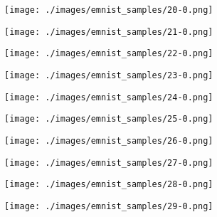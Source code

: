 \begin{figure}[H]
    \begin{subfigure}{.10\textwidth}
        \centering
        \texttt{[image: ./images/emnist\_samples/20-0.png]}
    \end{subfigure}%
    \begin{subfigure}{.10\textwidth}
        \centering
        \texttt{[image: ./images/emnist\_samples/21-0.png]}
    \end{subfigure}%
    \begin{subfigure}{.10\textwidth}
        \centering
        \texttt{[image: ./images/emnist\_samples/22-0.png]}
    \end{subfigure}%
    \begin{subfigure}{.10\textwidth}
        \centering
        \texttt{[image: ./images/emnist\_samples/23-0.png]}
    \end{subfigure}%
    \begin{subfigure}{.10\textwidth}
        \centering
        \texttt{[image: ./images/emnist\_samples/24-0.png]}
    \end{subfigure}%
    \begin{subfigure}{.10\textwidth}
        \centering
        \texttt{[image: ./images/emnist\_samples/25-0.png]}
    \end{subfigure}%
    \begin{subfigure}{.10\textwidth}
        \centering
        \texttt{[image: ./images/emnist\_samples/26-0.png]}
    \end{subfigure}%
    \begin{subfigure}{.10\textwidth}
        \centering
        \texttt{[image: ./images/emnist\_samples/27-0.png]}
    \end{subfigure}%
    \begin{subfigure}{.10\textwidth}
        \centering
        \texttt{[image: ./images/emnist\_samples/28-0.png]}
    \end{subfigure}%
    \begin{subfigure}{.10\textwidth}
        \centering
        \texttt{[image: ./images/emnist\_samples/29-0.png]}
    \end{subfigure}%


\end{figure}
